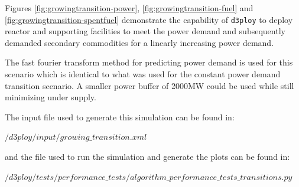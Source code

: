 \documentclass[11pt]{article}
\newcommand{\deploy}{\texttt{d3ploy}\xspace}%
\begin{document}
Figures \ref{fig:growingtransition-power}, \ref{fig:growingtransition-fuel}
and \ref{fig:growingtransition-spentfuel} demonstrate the capability 
of \deploy to deploy reactor and supporting facilities to meet the
power demand and subsequently demanded secondary commodities 
for a linearly increasing power demand. 

The fast fourier transform method for predicting power demand is used for 
this scenario
which is identical to what was used for the constant power demand 
transition scenario. 
A smaller power buffer of 2000MW could be used while still 
minimizing under supply. 

The input file used to generate this simulation can be found in:

\noindent
$/d3ploy/input/growing\_transition.xml$

\noindent
and the file used to run the simulation and generate the plots can be found in:

\noindent
$/d3ploy/tests/performance\_tests/algorithm\_performance\_tests\_transitions.py$
\end{document}
